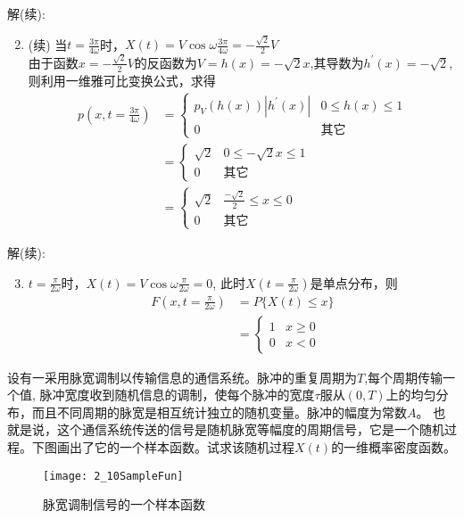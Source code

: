 \begin{frame}
解(续):
\begin{enumerate}
	\setcounter{enumi}{1} %
	\item (续) 当$t=\frac{3\pi}{4\omega}$时，$X(t)=V\cos\omega\frac{3\pi}{4\omega}=-\frac{\sqrt{2}}{2}V$\\
	由于函数$x=-\frac{\sqrt{2}}{2}V$的反函数为$V=h(x)=-\sqrt{2}x$,其导数为$h^\prime(x)=-\sqrt{2}$,则利用一维雅可比变换公式，求得
	\begin{align*}
		p(x,t=\frac{3\pi}{4\omega}) &=\begin{cases}
		p_V(h(x))|h^\prime(x)| &0\le h(x)\le 1\\
		0 &\text{其它}
		\end{cases}\\
		&=\begin{cases}
		\sqrt{2} &0\le -\sqrt{2}x\le 1\\
		0 &\text{其它}
		\end{cases}\\
		&=\begin{cases}
		\sqrt{2} &\frac{-\sqrt{2}}{2}\le x\le 0\\
		0 &\text{其它}
		\end{cases}
	\end{align*}
\end{enumerate}
\end{frame}

\begin{frame}
解(续):
\begin{enumerate}
	\setcounter{enumi}{2} %
	\item $t=\frac{\pi}{2\omega}$时，$X(t)=V\cos\omega\frac{\pi}{2\omega}=0$, 此时$X(t=\frac{\pi}{2\omega})$是单点分布，则
	\begin{align*}
	F(x,t=\frac{\pi}{2\omega}) &=P\{X(t)\le x \}\\
	&=\begin{cases}
	1 &x\ge 0\\
	0 &x<0
	\end{cases}
	\end{align*}
\end{enumerate}
\end{frame}

\begin{frame}
\begin{example}
设有一采用脉宽调制以传输信息的通信系统。脉冲的重复周期为$T$,每个周期传输一个值, 脉冲宽度收到随机信息的调制，使每个脉冲的宽度$\tau$服从$(0,T)$上的均匀分布，而且不同周期的脉宽是相互统计独立的随机变量。脉冲的幅度为常数$A$。 也就是说，这个通信系统传送的信号是随机脉宽等幅度的周期信号，它是一个随机过程。下图画出了它的一个样本函数。试求该随机过程$X(t)$的一维概率密度函数。
\end{example}
\begin{figure}
	\texttt{[image: 2\_10SampleFun]}
	\caption {脉宽调制信号的一个样本函数}
\end{figure}
\end{frame}

